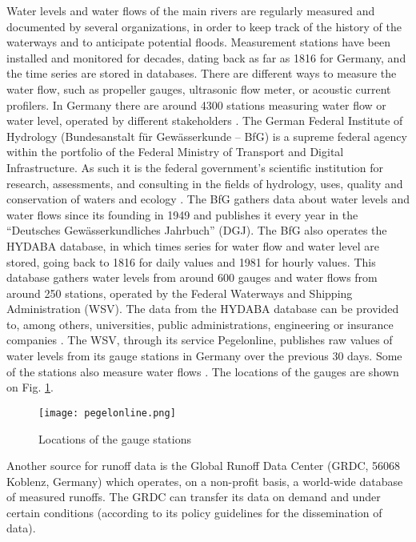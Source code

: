 Water levels and water flows of the main rivers are regularly measured and documented by several organizations, in order to keep track of the history of the waterways and to anticipate potential floods. Measurement stations have been installed and monitored for decades, dating back as far as 1816 for Germany, and the time series are stored in databases. There are different ways to measure the water flow, such as propeller gauges, ultrasonic flow meter, or acoustic current profilers. In Germany there are around 4300 stations measuring water flow or water level, operated by different stakeholders \cite{bafg_hyd}.  The German Federal Institute of Hydrology (Bundesanstalt für Gewässerkunde – BfG) is a supreme federal agency within the portfolio of the Federal Ministry of Transport and Digital Infrastructure. As such it is the federal government's scientific institution for research, assessments, and consulting in the fields of hydrology, uses, quality and conservation of waters and ecology \cite{bafg}. The BfG gathers data about water levels and water flows since its founding in 1949 and publishes it every year in the ``Deutsches Gewässerkundliches Jahrbuch'' (DGJ). The BfG also operates the HYDABA database, in which times series for water flow and water level are stored, going back to 1816 for daily values and 1981 for hourly values. This database gathers water levels from around 600 gauges and water flows from around 250 stations, operated by the Federal Waterways and Shipping Administration (WSV). The data from the HYDABA database can be provided to, among others, universities, public administrations, engineering or insurance companies \cite{bafg_hyd}. \newline
The WSV, through its service Pegelonline, publishes raw values of water levels from its gauge stations in Germany over the previous 30 days. Some of the stations also measure water flows \cite{pegelonline}. The locations of the gauges are shown on Fig. \ref{pegelonline}.

\begin{figure}[H]
\centering
\texttt{[image: pegelonline.png]}
\caption[Locations of the gauge stations]{Locations of the gauge stations \cite{pegelonline}}
\label{pegelonline}
\end{figure}

Another source for runoff data is the Global Runoff Data Center (GRDC, 56068 Koblenz, Germany) which operates, on a non-profit basis, a world-wide database of measured runoffs. The GRDC can transfer its data on demand and under certain conditions (according to its policy guidelines for the dissemination of data).\newline

